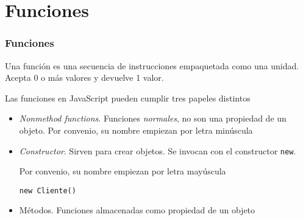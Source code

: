 \documentclass[ucs]{beamer}
\begin{document}
\section{Funciones}
\begin{frame}[fragile]
\frametitle{Funciones}

Una función es una secuencia de instrucciones empaquetada como una unidad.
Acepta 0 o más valores y devuelve 1 valor.


Las funciones en JavaScript pueden cumplir tres papeles distintos


    \begin{itemize}
    \item
\emph{Nonmethod functions}. Funciones \emph{normales}, no son una propiedad
de un objeto.
Por convenio, su nombre empiezan por letra minúscula

    \item
\emph{Constructor}. Sirven para crear objetos. Se invocan con el constructor
\verb|new|.

Por convenio, su nombre empiezan por letra mayúscula

\verb|new Cliente()|

    \item
Métodos. Funciones almacenadas como propiedad de un objeto
    \end{itemize}
\end{frame}
\end{document}
